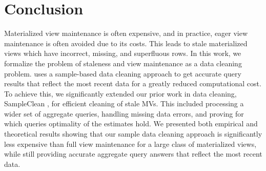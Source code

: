 \vspace{-1em}
\section{Conclusion}\label{conclusion}
\vspace{-.3em}
Materialized view maintenance is often expensive, and in practice, eager view maintenance is often avoided due to its costs.
This leads to stale materialized views which have incorrect, missing, and superfluous rows.
In this work, we formalize the problem of staleness and view maintenance as a data cleaning problem.
\svc uses a sample-based data cleaning approach to get accurate query results that reflect the most recent data for a greatly reduced computational cost.
To achieve this, we significantly extended our prior work in data cleaning, SampleClean \cite{wang1999sample}, for efficient cleaning of stale MVs. 
This included processing a wider set of aggregate queries, handling missing data errors, and proving for which queries optimality of the estimates hold.
We presented both empirical and theoretical results showing that our sample data cleaning approach is significantly less expensive than full view maintenance for a large class of materialized views, while still providing accurate aggregate query answers that reflect the most recent data.





